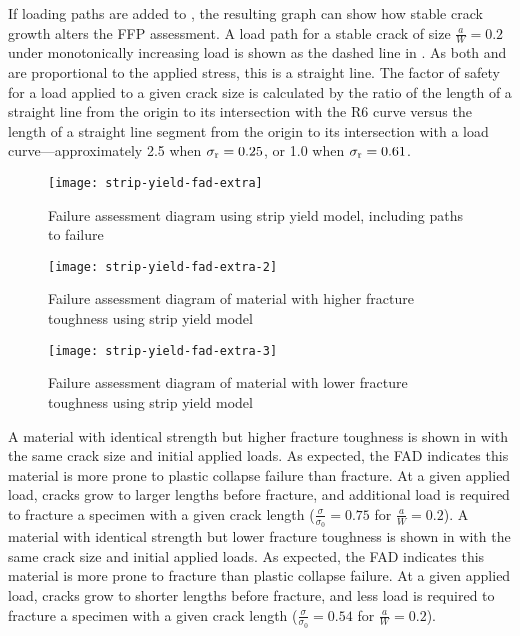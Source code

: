 If loading paths are added to , the resulting graph can show how stable crack growth alters the FFP assessment.
A load path for a stable crack of size \(\frac{a}{W}=0.2\) under monotonically increasing load is shown as the dashed line in .
As both \Kr and \Sr are proportional to the applied stress, this is a straight line.
The factor of safety for a load applied to a given crack size is calculated by the ratio of the length of a straight line from the origin to its intersection with the R6 curve versus the length of a straight line segment from the origin to its intersection with a load curve---approximately 2.5 when \(\sigma_{\textnormal{r}} = 0.25\), or 1.0 when \(\sigma_{\textnormal{r}} = 0.61\).
\begin{figure}
\centering
\texttt{[image: strip-yield-fad-extra]}
\caption{\label{fig:strip-yield-fad-extra} Failure assessment diagram using strip yield model, including paths to failure}
\end{figure}
\begin{figure}
\centering
\texttt{[image: strip-yield-fad-extra-2]}
\caption{\label{fig:strip-yield-fad-extra-2} Failure assessment diagram of material with higher fracture toughness using strip yield model}
\end{figure}
\begin{figure}
\centering
\texttt{[image: strip-yield-fad-extra-3]}
\caption{\label{fig:strip-yield-fad-extra-3} Failure assessment diagram of material with lower fracture toughness using strip yield model}
\end{figure}
A material with identical strength but higher fracture toughness is shown in  with the same crack size and initial applied loads.
As expected, the FAD indicates this material is more prone to plastic collapse failure than fracture.
At a given applied load, cracks grow to larger lengths before fracture, and additional load is required to fracture a specimen with a given crack length (\(\frac{\sigma}{\sigma_0} = 0.75\) for \(\frac{a}{W}=0.2\)).
A material with identical strength but lower fracture toughness is shown in  with the same crack size and initial applied loads.
As expected, the FAD indicates this material is more prone to fracture than plastic collapse failure.
At a given applied load, cracks grow to shorter lengths before fracture, and less load is required to fracture a specimen with a given crack length (\(\frac{\sigma}{\sigma_0} = 0.54\) for \(\frac{a}{W}=0.2\)).

